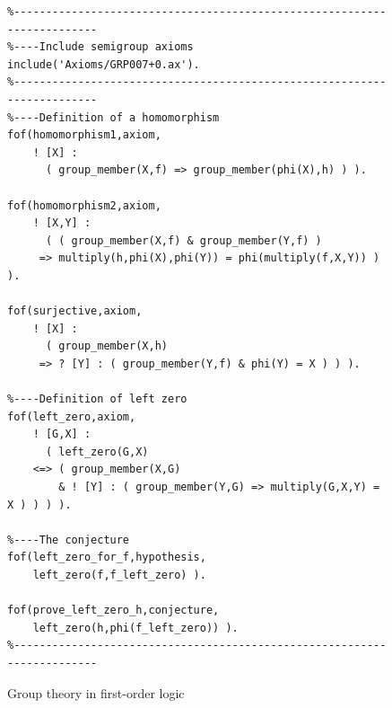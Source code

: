 \documentclass[runningheads]{llncs}
\begin{document}
\begin{figure}[htb]
\centering
{\footnotesize
{\setlength{\baselineskip}{3mm}
\begin{verbatim}
%------------------------------------------------------------------------
%----Include semigroup axioms
include('Axioms/GRP007+0.ax').
%------------------------------------------------------------------------
%----Definition of a homomorphism
fof(homomorphism1,axiom,
    ! [X] :
      ( group_member(X,f) => group_member(phi(X),h) ) ).

fof(homomorphism2,axiom,
    ! [X,Y] :
      ( ( group_member(X,f) & group_member(Y,f) )
     => multiply(h,phi(X),phi(Y)) = phi(multiply(f,X,Y)) ) ).

fof(surjective,axiom,
    ! [X] :
      ( group_member(X,h)
     => ? [Y] : ( group_member(Y,f) & phi(Y) = X ) ) ).

%----Definition of left zero
fof(left_zero,axiom,
    ! [G,X] :
      ( left_zero(G,X)
    <=> ( group_member(X,G)
        & ! [Y] : ( group_member(Y,G) => multiply(G,X,Y) = X ) ) ) ).

%----The conjecture
fof(left_zero_for_f,hypothesis,
    left_zero(f,f_left_zero) ).

fof(prove_left_zero_h,conjecture,
    left_zero(h,phi(f_left_zero)) ).
%------------------------------------------------------------------------
\end{verbatim}
}}
\caption{Group theory in first-order logic}
\label{ExampleFOF}
\end{figure}
\end{document}
